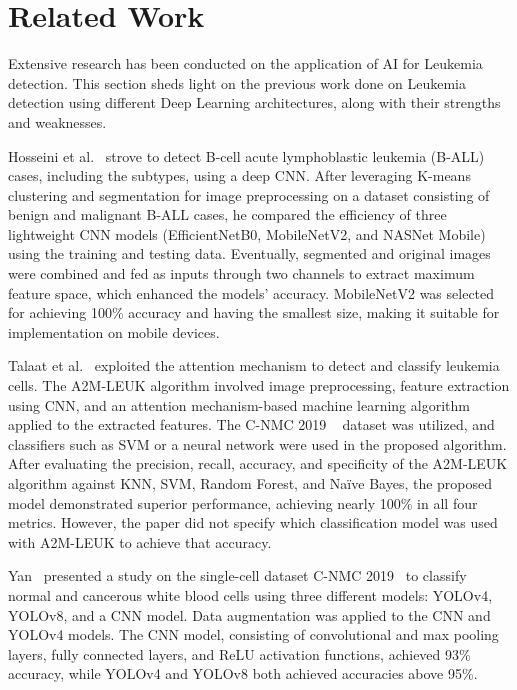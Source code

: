\section{Related Work}
\label{sec:relatedwork}

Extensive research has been conducted on the application of AI for Leukemia detection. This section sheds light on the previous work done on Leukemia detection using different Deep Learning architectures, along with their strengths and weaknesses.

Hosseini et al.~\cite{Hosseini2023} strove to detect B-cell acute lymphoblastic leukemia (B-ALL) cases, including the subtypes, using a deep CNN. After leveraging K-means clustering and segmentation for image preprocessing on a dataset consisting of benign and malignant B-ALL cases, he compared the efficiency of three lightweight CNN models (EfficientNetB0, MobileNetV2, and NASNet Mobile) using the training and testing data. Eventually, segmented and original images were combined and fed as inputs through two channels to extract maximum feature space, which enhanced the models' accuracy. MobileNetV2 was selected for achieving 100\% accuracy and having the smallest size, making it suitable for implementation on mobile devices.

Talaat et al.~\cite{Talaat2023} exploited the attention mechanism to detect and classify leukemia cells. The A2M-LEUK algorithm involved image preprocessing, feature extraction using CNN, and an attention mechanism-based machine learning algorithm applied to the extracted features. The C-NMC 2019 ~\cite{Mourya2019} dataset was utilized, and classifiers such as SVM or a neural network were used in the proposed algorithm. After evaluating the precision, recall, accuracy, and specificity of the A2M-LEUK algorithm against KNN, SVM, Random Forest, and Naïve Bayes, the proposed model demonstrated superior performance, achieving nearly 100\% in all four metrics. However, the paper did not specify which classification model was used with A2M-LEUK to achieve that accuracy.

Yan~\cite{Yan2024} presented a study on the single-cell dataset C-NMC 2019~\cite{Mourya2019} to classify normal and cancerous white blood cells using three different models: YOLOv4, YOLOv8, and a CNN model. Data augmentation was applied to the CNN and YOLOv4 models. The CNN model, consisting of convolutional and max pooling layers, fully connected layers, and ReLU activation functions, achieved 93\% accuracy, while YOLOv4 and YOLOv8 both achieved accuracies above 95\%.

